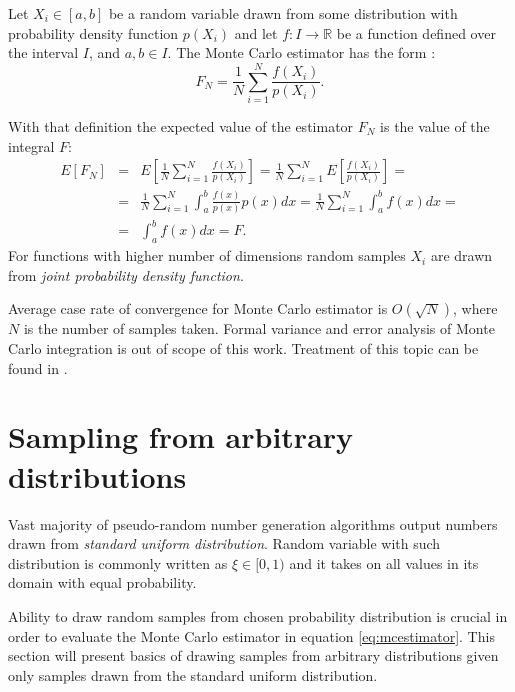 \begin{df}
  Let $X_{i} \in [a,b]$ be a random variable drawn from some distribution with probability density function $p(X_{i})$ and let $f: I \rightarrow \mathbb{R}$ be a function defined over the interval $I$, and $a,b \in I$. The Monte Carlo estimator has the form \parencite{veach97}:
\begin{equation}
\label{eq:mcestimator}
  F_{N} = \frac{1}{N} \sum_{i=1}^{N} \frac{f(X_{i})}{p(X_{i})}.
\end{equation}
\end{df}
With that definition the expected value of the estimator $F_{N}$ is the value of the integral $F$:
\begin{eqnarray}
  E[F_{N}] &=& E\left[ \frac{1}{N} \sum_{i=1}^{N} \frac{f(X_{i})}{p(X_{i})} \right]
  = \frac{1}{N} \sum_{i=1}^{N} E \left[ \frac{f(X_{i})}{p(X_{i})} \right] = \nonumber \\
  &=& \frac{1}{N} \sum_{i=1}^{N} \int_{a}^{b} \frac{f(x)}{p(x)} p(x) dx
  = \frac{1}{N} \sum_{i=1}^{N} \int_{a}^{b} f(x) dx = \nonumber \\
  &=& \int_{a}^{b} f(x)dx = F.
\end{eqnarray}
For functions with higher number of dimensions random samples $X_{i}$ are drawn from \emph{joint probability density function}.

Average case rate of convergence for Monte Carlo estimator is $O(\sqrt{N})$, where $N$ is the number of samples taken. Formal variance and error analysis of Monte Carlo integration is out of scope of this work. Treatment of this topic can be found in \cite{robert2004}.

\section{Sampling from arbitrary distributions}
Vast majority of pseudo-random number generation algorithms output numbers drawn from \emph{standard uniform distribution}. Random variable with such distribution is commonly written as $\xi \in [0,1)$ and it takes on all values in its domain with equal probability.

Ability to draw random samples from chosen probability distribution is crucial in order to evaluate the Monte Carlo estimator in equation \ref{eq:mcestimator}. This section will present basics of drawing samples from arbitrary distributions given only samples drawn from the standard uniform distribution.

